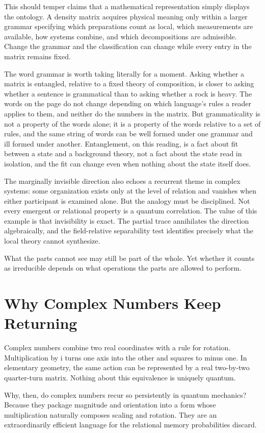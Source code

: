 \documentclass[12pt,openany]{book}
\begin{document}
This should temper claims that a mathematical representation simply displays the ontology. A density matrix acquires physical meaning only within a larger grammar specifying which preparations count as local, which measurements are available, how systems combine, and which decompositions are admissible. Change the grammar and the classification can change while every entry in the matrix remains fixed.

The word grammar is worth taking literally for a moment. Asking whether a matrix is entangled, relative to a fixed theory of composition, is closer to asking whether a sentence is grammatical than to asking whether a rock is heavy. The words on the page do not change depending on which language's rules a reader applies to them, and neither do the numbers in the matrix. But grammaticality is not a property of the words alone; it is a property of the words relative to a set of rules, and the same string of words can be well formed under one grammar and ill formed under another. Entanglement, on this reading, is a fact about fit between a state and a background theory, not a fact about the state read in isolation, and the fit can change even when nothing about the state itself does.

The marginally invisible direction also echoes a recurrent theme in complex systems: some organization exists only at the level of relation and vanishes when either participant is examined alone. But the analogy must be disciplined. Not every emergent or relational property is a quantum correlation. The value of this example is that invisibility is exact. The partial trace annihilates the direction algebraically, and the field-relative separability test identifies precisely what the local theory cannot synthesize.

What the parts cannot see may still be part of the whole. Yet whether it counts as irreducible depends on what operations the parts are allowed to perform.

\chapter{Why Complex Numbers Keep Returning}
Complex numbers combine two real coordinates with a rule for rotation. Multiplication by i turns one axis into the other and squares to minus one. In elementary geometry, the same action can be represented by a real two-by-two quarter-turn matrix. Nothing about this equivalence is uniquely quantum.

Why, then, do complex numbers recur so persistently in quantum mechanics? Because they package magnitude and orientation into a form whose multiplication naturally composes scaling and rotation. They are an extraordinarily efficient language for the relational memory probabilities discard.
\end{document}

